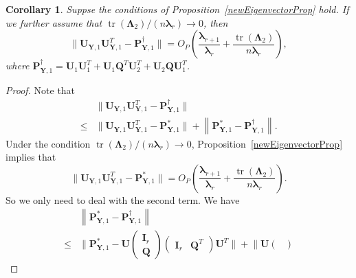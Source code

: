 \documentclass[12pt]{article} %
\DeclareMathOperator{\mytr}{tr}
\newcommand{\bQ}{\mathbf{Q}}
\newcommand{\bP}{\mathbf{P}}
\newcommand{\bY}{\mathbf{Y}}
\newcommand{\bI}{\mathbf{I}}
\newcommand{\bU}{\mathbf{U}}
\newcommand{\bfsym}[1]{\ensuremath{\boldsymbol{#1}}}
\def\blambda {\bfsym {\lambda}}
\def\bLambda {\bfsym {\Lambda}}
\newtheorem{corollary}{Corollary}
\theoremstyle{definition}
\begin{document}
\begin{appendices}
\begin{corollary}\label{newEigenvectorPropCor}
    Suppse the conditions of Proposition~\ref{newEigenvectorProp} hold.
    If we further assume that $\mytr(\bLambda_2)/(n\blambda_r)\to 0$, then
    \begin{equation*}
        \|\bU_{\bY,1}\bU_{\bY,1}^T - 
        \bP_{\bY,1}^{\dagger}\|
        =O_P\left(\frac{\blambda_{r+1}}{\blambda_r}+\frac{\mytr(\bLambda_2)}{n\blambda_r}\right),
    \end{equation*}
where
$
\bP_{\bY,1}^{\dagger}
=\bU_1 \bU_1^T + \bU_1 \bQ^T \bU_2^T
            +\bU_2 \bQ \bU_1^T
            $.
\end{corollary}
\begin{proof}
    Note that
    \begin{equation*}
        \begin{split}
        &
        \|\bU_{\bY,1}\bU_{\bY,1}^T - 
\bP_{\bY,1}^{\dagger}
        \|
        \\
        \leq&
        \|\bU_{\bY,1}\bU_{\bY,1}^T - 
        \bP_{\bY,1}^*
        \|
        +\left\|
        \bP_{\bY,1}^* 
            -
\bP_{\bY,1}^{\dagger}
            \right\|.
        \end{split}
    \end{equation*}
    Under the condition $\mytr(\bLambda_2)/(n\blambda_r)\to 0$, Proposition~\ref{newEigenvectorProp} implies that
    \begin{equation*}
        \|\bU_{\bY,1}\bU_{\bY,1}^T - 
        \bP_{\bY,1}^*
        \|
    =O_P\left(\frac{\blambda_{r+1}}{\blambda_r}+\frac{\mytr(\bLambda_2)}{n\blambda_r}\right).
    \end{equation*}
    So we only need to deal with the second term.
    We have
    \begin{equation*}
        \begin{split}
        &\left\|
        \bP_{\bY,1}^* 
            -
\bP_{\bY,1}^{\dagger}
        \right\|
        \\
        \leq&
        \Big\|
        \bP_{\bY,1}^* 
        -
        \bU
        \begin{pmatrix}
           \bI_r \\
           \bQ
        \end{pmatrix}
        \begin{pmatrix}
            \bI_r
              &
              \bQ^T
            \end{pmatrix}
            \bU^T
        \Big\|
        +
        \Big\|
        \bU
        \begin{pmatrix}

\end{pmatrix}
\end{split}
\end{equation*}
\end{proof}
\end{appendices}
\end{document}

